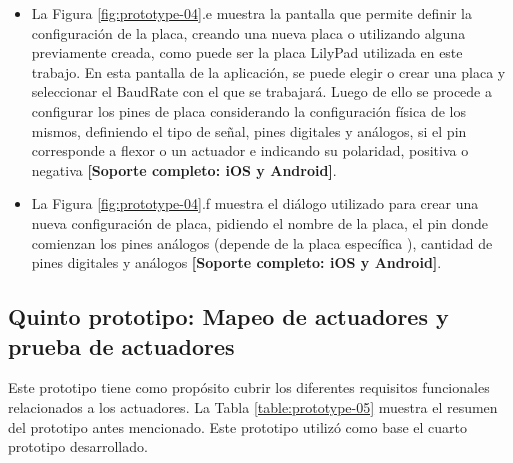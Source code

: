 \begin{itemize}
\item La Figura \ref{fig:prototype-04}.e muestra la pantalla que permite definir la configuración de la placa, creando una nueva placa o utilizando alguna previamente creada, como puede ser la placa LilyPad utilizada en este trabajo. En esta pantalla de la aplicación, se puede elegir o crear una placa y seleccionar el BaudRate con el que se trabajará. Luego de ello se procede a configurar los pines de placa considerando la configuración física de los mismos, definiendo el tipo de señal, pines digitales y análogos, si el pin corresponde a flexor o un actuador e indicando su polaridad, positiva o negativa \textbf{[Soporte completo: iOS y Android]}.

\item La Figura \ref{fig:prototype-04}.f muestra el diálogo utilizado para crear una nueva configuración de placa, pidiendo el nombre de la placa, el pin donde comienzan los pines análogos (depende de la placa específica \citep{tesis-cerda-rodrigo}), cantidad de pines digitales y análogos \textbf{[Soporte completo: iOS y Android]}.

\end{itemize}






\subsection{Quinto  prototipo: Mapeo de actuadores y prueba de actuadores}
\label{quinto-prototipo}
Este prototipo tiene como propósito cubrir los diferentes requisitos funcionales relacionados a los actuadores.  La Tabla \ref{table:prototype-05} muestra el resumen del prototipo antes mencionado. Este prototipo utilizó como base el cuarto prototipo desarrollado.


